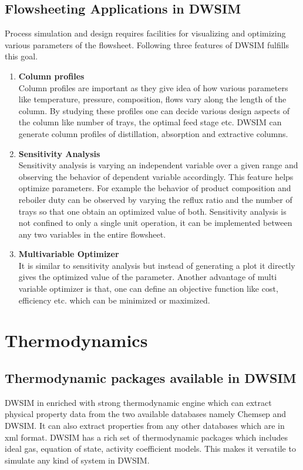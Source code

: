 \documentclass[12pt]{report}
\begin{document}
\subsection{Flowsheeting Applications in DWSIM}
Process simulation and design requires facilities for visualizing and optimizing various parameters of the flowsheet. Following three features of DWSIM fulfills this goal.
\begin{enumerate}
\item {\textbf{Column profiles}} \\
Column profiles are important as they give idea of how various parameters like temperature, pressure, composition, flows vary along the length of the column. By studying these profiles one can decide various design aspects of the column like number of trays, the optimal feed stage etc. DWSIM can generate column profiles of distillation, absorption and extractive columns.

\item{\textbf{Sensitivity Analysis}} \\
Sensitivity analysis is varying an independent variable over a given range and observing the behavior of dependent variable accordingly. This feature helps optimize parameters. For example the behavior of product composition and reboiler duty can be observed by varying the reflux ratio and the number of trays so that one obtain an optimized value of both. Sensitivity analysis is not confined to only a single unit operation, it can be implemented between any two variables in the entire flowsheet.

\item{\textbf{Multivariable Optimizer}} \\
It is similar to sensitivity analysis but instead of generating a plot it directly gives the optimized value of the parameter. Another advantage of multi variable optimizer is that, one can define an objective function like cost, efficiency etc. which can be minimized or maximized.

\end{enumerate}

\section{Thermodynamics}
\subsection{Thermodynamic packages available in DWSIM}
DWSIM in enriched with strong thermodynamic engine which can extract physical property data from the two available databases namely Chemsep and DWSIM. It can also extract properties from any other databases which are in xml format. DWSIM has a rich set of thermodynamic packages which includes ideal gas, equation of state, activity coefficient models. This makes it versatile to simulate any kind of system in DWSIM.
\end{document}
